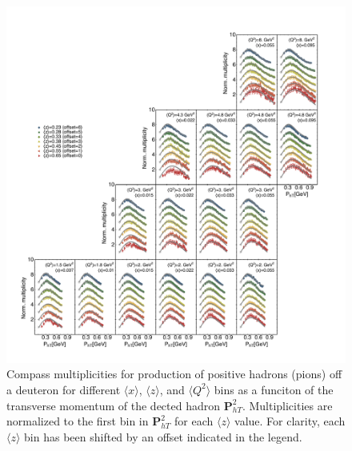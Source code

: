 \documentclass[aps,preprintnumbers,showpacs,nofootinbib,superscriptaddress,floatfix]{revtex4}
\begin{document}
\begin{figure}[h!]
\begin{center}
\includegraphics[width=\textwidth]{plots/COMPASS_SCIplot_flINDEP_Piplus.pdf}
\end{center}
\caption{Compass multiplicities for production of positive hadrons (pions) off
  a deuteron for different $\langle x \rangle$, $\langle z \rangle$, and
  $\langle Q^2 \rangle$ bins as a funciton of the transverse momentum of the
  dected hadron ${\bm P}_{hT}^ 2$. Multiplicities are normalized to the first
  bin in ${\bm P}_{hT}^ 2$ for each $\langle z \rangle$ value. For clarity,
  each $\langle z \rangle$  bin has been shifted by an offset indicated in the legend.} 
\label{f:C_pip}
\end{figure}
\end{document}
